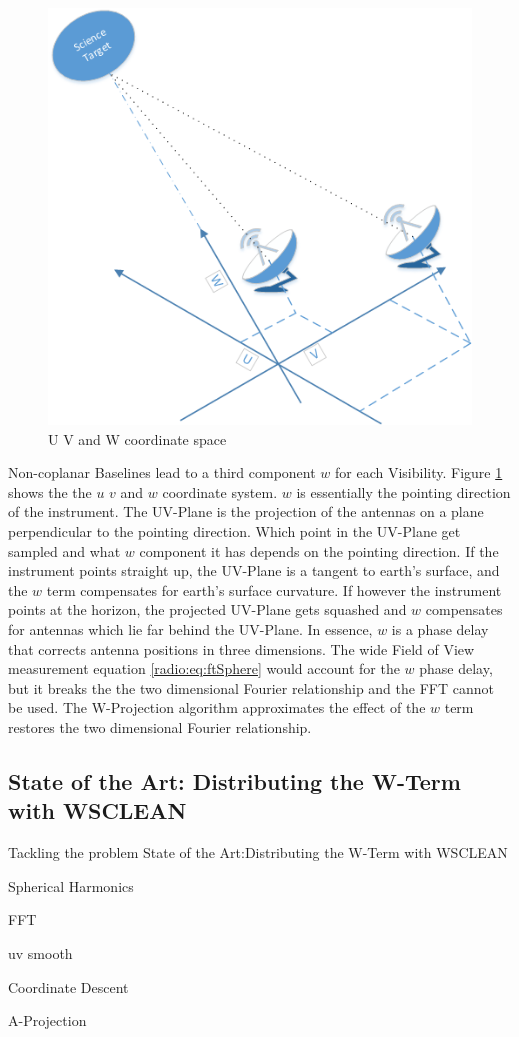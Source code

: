 \begin{figure}
	\centering
	\includegraphics[width=0.9\linewidth]{./chapters/03.radio/uvw.png}
	\caption{U V and W coordinate space}
	\label{radio:uvw}
	\vspace{-10pt}
\end{figure}

Non-coplanar Baselines lead to a third component $w$ for each Visibility. Figure \ref{radio:uvw} shows the the $u$ $v$ and $w$ coordinate system. $w$ is essentially the pointing direction of the instrument. The UV-Plane is the projection of the antennas on a plane perpendicular to the pointing direction. Which point in the UV-Plane get sampled and what $w$ component it has depends on the pointing direction. If the instrument points straight up, the UV-Plane is a tangent to earth's surface, and the $w$ term compensates for earth's surface curvature. If however the instrument points at the horizon, the projected UV-Plane gets squashed and $w$ compensates for antennas which lie far behind the UV-Plane. In essence, $w$ is a phase delay that corrects antenna positions in three dimensions. The wide Field of View measurement equation \eqref{radio:eq:ftSphere} would account for the $w$ phase delay, but it breaks the the two dimensional Fourier relationship and the FFT cannot be used. The W-Projection \cite{cornwell2008noncoplanar} algorithm approximates the effect of the $w$ term restores the two dimensional Fourier relationship.


\subsection{State of the Art: Distributing the W-Term with WSCLEAN} 





Tackling the problem
State of the Art:Distributing the W-Term with WSCLEAN

Spherical Harmonics

FFT

uv smooth

Coordinate Descent



A-Projection \cite{bhatnagar2008correcting}







